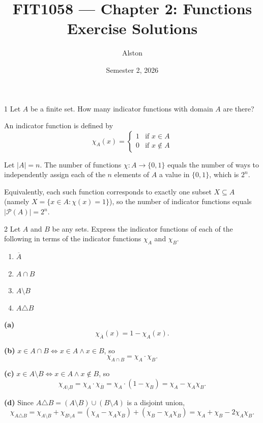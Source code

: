 \documentclass[11pt]{article}
\title{FIT1058 --- Chapter 2: Functions\\ \large Exercise Solutions}
\author{Alston}
\date{Semester 2, 2026}
\begin{document}
\maketitle

\begin{exercise}{1}
    Let $A$ be a finite set. How many indicator functions with domain
    $A$ are there?
\end{exercise}
\begin{solution}
    An indicator function is defined by
    \[
        \chi_A(x) = \begin{cases} 1 & \text{if } x\in A \\
            0 & \text{if } x\notin A \end{cases}
    \]

    Let $|A|=n$. The number of functions $\chi: A\to\{0,1\}$ equals
    the number of ways to independently assign each of the $n$
    elements of $A$ a value in $\{0,1\}$, which is $2^n$.

    Equivalently, each such function corresponds to exactly one
    subset $X\subseteq A$ (namely $X=\{x\in A : \chi(x)=1\}$), so the
    number of indicator functions equals $|\mathcal P(A)| = 2^n$.
\end{solution}

\begin{exercise}{2}
    Let $A$ and $B$ be any sets. Express the indicator functions of
    each of the following in terms of the indicator functions
    $\chi_A$ and $\chi_B$.
    \begin{enumerate}[label=(\alph*)]
        \item $\overline{A}$
        \item $A\cap B$
        \item $A\setminus B$
        \item $A\triangle B$
    \end{enumerate}
\end{exercise}
\begin{solution}
    \textbf{(a)}
    \[
        \chi_{\overline A}(x) = 1-\chi_A(x).
    \]

    \textbf{(b)} $x\in A\cap B \iff x\in A \wedge x\in B$, so
    \[
        \chi_{A\cap B} = \chi_A\cdot\chi_B.
    \]

    \textbf{(c)} $x\in A\setminus B \iff x\in A \wedge x\notin B$, so
    \[
        \chi_{A\setminus B} = \chi_A\cdot\chi_{\overline B}
        = \chi_A\cdot(1-\chi_B) = \chi_A - \chi_A\chi_B.
    \]

    \textbf{(d)} Since $A\triangle B = (A\setminus B)\cup(B\setminus
    A)$ is a disjoint union,
    \[
        \chi_{A\triangle B} = \chi_{A\setminus B}+\chi_{B\setminus A}
        = (\chi_A-\chi_A\chi_B)+(\chi_B-\chi_A\chi_B)
        = \chi_A+\chi_B-2\chi_A\chi_B.
    \]
\end{solution}
\end{document}
